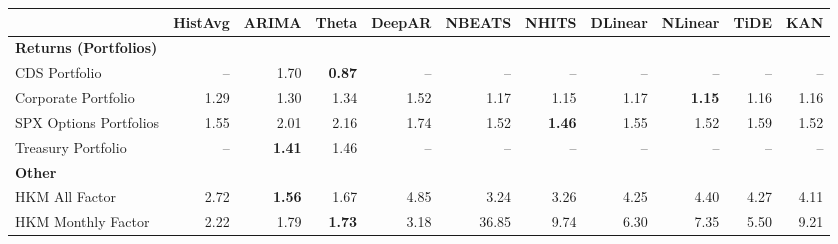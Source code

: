 \scriptsize
\setlength{\tabcolsep}{1.5pt}
\renewcommand{\arraystretch}{0.9}
\begin{tabular}{@{}lrrrrrrrrrr@{}}
\toprule
 & HistAvg & ARIMA & Theta & DeepAR & NBEATS & NHITS & DLinear & NLinear & TiDE & KAN \\
\midrule
\multicolumn{11}{l}{\textbf{Returns (Portfolios)}} \\
CDS Portfolio & -- & 1.70 & \textbf{0.87} & -- & -- & -- & -- & -- & -- & -- \\
Corporate Portfolio & 1.29 & 1.30 & 1.34 & 1.52 & 1.17 & 1.15 & 1.17 & \textbf{1.15} & 1.16 & 1.16 \\
SPX Options Portfolios & 1.55 & 2.01 & 2.16 & 1.74 & 1.52 & \textbf{1.46} & 1.55 & 1.52 & 1.59 & 1.52 \\
Treasury Portfolio & -- & \textbf{1.41} & 1.46 & -- & -- & -- & -- & -- & -- & -- \\
\midrule
\multicolumn{11}{l}{\textbf{Other}} \\
HKM All Factor & 2.72 & \textbf{1.56} & 1.67 & 4.85 & 3.24 & 3.26 & 4.25 & 4.40 & 4.27 & 4.11 \\
HKM Monthly Factor & 2.22 & 1.79 & \textbf{1.73} & 3.18 & 36.85 & 9.74 & 6.30 & 7.35 & 5.50 & 9.21 \\
\bottomrule
\end{tabular}